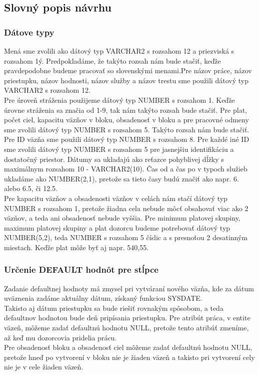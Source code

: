\documentclass[slovak, 12pt, Times New Roman]{article}
\begin{document}
		\subsection{Slovný popis návrhu}
			\subsubsection{Dátove typy}
				Mená sme zvolili ako dátový typ VARCHAR2 s rozsahom 12 a priezviská s rozsahom 1ý. Predpokladáme, že takýto rozsah nám bude stačiť, keďže pravdepodobne budeme pracovať so slovenskými menami.Pre názov práce, názov priestupku, názov hodnosti, názov služby a názov trestu sme použili dátový typ VARCHAR2 s rozsahom 12. \\
				Pre úroveň stráženia použijeme dátový typ NUMBER s rozsahom 1. Keďže úrovne stráženia sa značia od 1-9, tak nám takýto rozsah bude stačiť. 
				Pre plat, počet ciel, kapacitu väzňov v bloku, obsadenosť v bloku a pre pracovné odmeny sme zvolili dátový typ NUMBER s rozsahom 5. Takýto rozsah nám bude stačiť.\\
				Pre ID väzňa sme použili dátový typ NUMBER s rozsahom 8.
				Pre každé iné ID sme zvolili dátový typ NUMBER s rozsahom 5 pre jasnejšiu identifikáciu a dostatočný priestor. 
				Dátumy sa ukladajú ako reťazce pohyblivej dĺžky s maximálnym rozsahom 10 - VARCHAR2(10).
				Čas od a čas po v typoch služieb ukladáme ako NUMBER(2,1), pretože sa tieto časy budú značiť ako napr. 6. alebo 6.5, či 12.5.\\
				Pre kapacitu väzňov a obsadenosti väzňov v celách nám stačí dátový typ NUMBER s rozsahom 1, pretože žiadna cela nebude môcť obsahovať viac ako 2 väzňov, a teda ani obsadenosť nebude vyššia. 
				Pre minimum platovej skupiny, maximum platovej skupiny a plat dozorcu budeme potrebovať dátový typ NUMBER(5,2), teda NUMBER s rozsahom 5 číslic a s presnoťou 2 desatinným miestach. Keďže plat môže byť aj napr. 540,55.
			\subsubsection{Určenie DEFAULT hodnôt pre stĺpce}
				Zadanie defaultnej hodnoty má zmysel pri vytváraní nového väzňa, kde za dátum uväznenia zadáme aktuálny dátum, získaný funkciou SYSDATE.\\
				Takisto aj dátum priestupku sa bude riešiť rovnakým spôsobom, a teda defaultnov hodnotou bude deň pripísania priestupku.
				Pre atribút práca, v entite väzeň, môžeme zadať defaultnú hodnotu NULL, pretože tento atribúť zmeníme, až keď mu dozorcovia pridelia prácu. \\
				Pre obsadenosť bloku a obsadenosť ciel môžeme zadať defaultnú hodnotu NULL, pretože hneď po vytvorení v bloku nie je žiaden väzeň a takisto pri vytvorení cely nie je v cele žiaden väzeň. 
\end{document}
